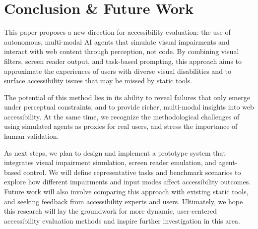 
\section{Conclusion \& Future Work}

This paper proposes a new direction for accessibility evaluation: the use of autonomous, multi-modal \ac{AI} agents that simulate visual impairments and interact with web content through perception, not code. By combining visual filters, screen reader output, and task-based prompting, this approach aims to approximate the experiences of users with diverse visual disabilities and to surface accessibility issues that may be missed by static tools.

The potential of this method lies in its ability to reveal failures that only emerge under perceptual constraints, and to provide richer, multi-modal insights into web accessibility. At the same time, we recognize the methodological challenges of using simulated agents as proxies for real users, and stress the importance of human validation.

As next steps, we plan to design and implement a prototype system that integrates visual impairment simulation, screen reader emulation, and agent-based control. We will define representative tasks and benchmark scenarios to explore how different impairments and input modes affect accessibility outcomes. Future work will also involve comparing this approach with existing static tools, and seeking feedback from accessibility experts and users. Ultimately, we hope this research will lay the groundwork for more dynamic, user-centered accessibility evaluation methods and inspire further investigation in this area.

